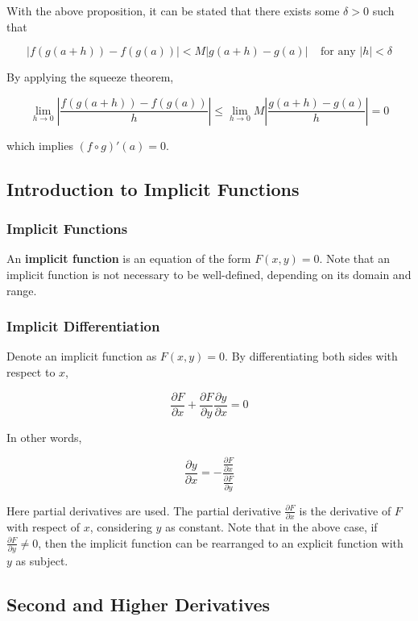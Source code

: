 With the above proposition, it can be stated that there exists some $\delta>0$ such that

$$\left| f(g(a+h))-f(g(a))\right| <M\left| g(a+h)-g(a)\right| \;\;\;\;\text{for any }\left| h\right| <\delta$$\s

By applying the squeeze theorem,

$$\lim_{h\to 0}\left| \frac{f(g(a+h))-f(g(a))}{h}\right| \leq\lim_{h\to 0}M\left| \frac{g(a+h)-g(a)}{h}\right| =0$$\s

which implies $(f\circ g)'(a)=0$.

\subsection{Introduction to Implicit Functions}
\subsubsection{Implicit Functions}
\begin{dft}
  An \textbf{implicit function} is an equation of the form $F(x,y)=0$. Note that an implicit function is not necessary to be well-defined, depending on its domain and range.
\end{dft}

\subsubsection{Implicit Differentiation}
\begin{dft}
  Denote an implicit function as $F(x,y)=0$. By differentiating both sides with respect to $x$,

  $$\frac{\partial F}{\partial x}+\frac{\partial F}{\partial y}\frac{\partial y}{\partial x}=0$$
\end{dft}\n

In other words,

$$\frac{\partial y}{\partial x}=-\frac{\frac{\partial F}{\partial x}}{\frac{\partial F}{\partial y}}$$\s

Here partial derivatives are used. The partial derivative $\frac{\partial F}{\partial x}$ is the derivative of $F$ with respect of $x$, considering $y$ as constant. Note that in the above case, if $\frac{\partial F}{\partial y}\neq 0$, then the implicit function can be rearranged to an explicit function with $y$ as subject.

\subsection{Second and Higher Derivatives}
